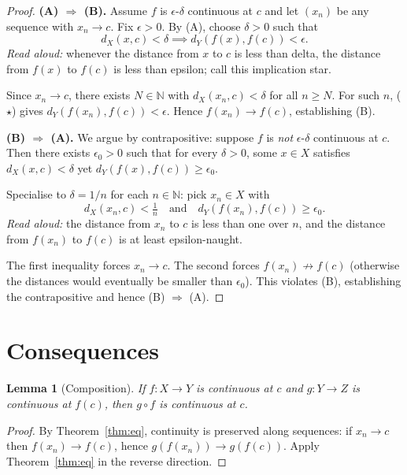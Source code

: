 \documentclass[11pt]{article}
\newtheorem{lemma}[theorem]{Lemma}
\begin{document}
\begin{proof}
\noindent\textbf{(A) $\Rightarrow$ (B).}
Assume $f$ is $\epsilon$-$\delta$ continuous at $c$ and let $(x_n)$ be any
sequence with $x_n \to c$. Fix $\epsilon > 0$. By (A), choose $\delta > 0$
such that
\[
  d_X(x, c) < \delta \implies d_Y(f(x), f(c)) < \epsilon. \tag{$\star$}
\]
\emph{Read aloud:} whenever the distance from $x$ to $c$ is less than delta, the distance from $f(x)$ to $f(c)$ is less than epsilon; call this implication star.

Since $x_n \to c$, there exists $N \in \mathbb{N}$ with $d_X(x_n, c) < \delta$
for all $n \geq N$. For such $n$, ($\star$) gives
$d_Y(f(x_n), f(c)) < \epsilon$. Hence $f(x_n) \to f(c)$, establishing (B).

\medskip
\noindent\textbf{(B) $\Rightarrow$ (A).}
We argue by contrapositive: suppose $f$ is \emph{not} $\epsilon$-$\delta$
continuous at $c$. Then there exists $\epsilon_0 > 0$ such that for every
$\delta > 0$, some $x \in X$ satisfies $d_X(x, c) < \delta$ yet
$d_Y(f(x), f(c)) \geq \epsilon_0$.

Specialise to $\delta = 1/n$ for each $n \in \mathbb{N}$: pick $x_n \in X$ with
\[
  d_X(x_n, c) < \tfrac{1}{n} \quad \text{and} \quad d_Y(f(x_n), f(c)) \geq \epsilon_0.
\]
\emph{Read aloud:} the distance from $x_n$ to $c$ is less than one over $n$, and the distance from $f(x_n)$ to $f(c)$ is at least epsilon-naught.

The first inequality forces $x_n \to c$. The second forces
$f(x_n) \not\to f(c)$ (otherwise the distances would eventually be smaller
than $\epsilon_0$). This violates (B), establishing the contrapositive and
hence (B) $\Rightarrow$ (A).
\end{proof}

\section{Consequences}

\begin{lemma}[Composition]
If $f : X \to Y$ is continuous at $c$ and $g : Y \to Z$ is continuous at
$f(c)$, then $g \circ f$ is continuous at $c$.
\end{lemma}

\begin{proof}
By Theorem~\ref{thm:eq}, continuity is preserved along sequences: if
$x_n \to c$ then $f(x_n) \to f(c)$, hence $g(f(x_n)) \to g(f(c))$. Apply
Theorem~\ref{thm:eq} in the reverse direction.
\end{proof}
\end{document}
